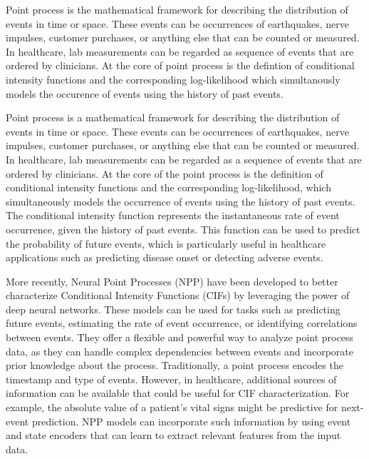 \documentclass[journal,twoside,web]{ieeecolor}
\begin{document}
Point process is the mathematical framework for describing the distribution of events in time or space. These events can be occurrences of earthquakes, nerve impulses, customer purchases, or anything else that can be counted or measured.
In healthcare, lab measurements can be regarded as sequence of events that are ordered by clinicians. At the core of point process is the defintion of conditional intensity functions and the corresponding log-likelihood which simultanously models the occurence of events using the history of past events.

Point process is a mathematical framework for describing the distribution of events in time or space. These events can be occurrences of earthquakes, nerve impulses, customer purchases, or anything else that can be counted or measured. In healthcare, lab measurements can be regarded as a sequence of events that are ordered by clinicians.
At the core of the point process is the definition of conditional intensity functions and the corresponding log-likelihood, which simultaneously models the occurrence of events using the history of past events. The conditional intensity function represents the instantaneous rate of event occurrence, given the history of past events. This function can be used to predict the probability of future events, which is particularly useful in healthcare applications such as predicting disease onset or detecting adverse events.


More recently, Neural Point Processes (NPP) have been developed to better characterize Conditional Intensity Functions (CIFs) by leveraging the power of deep neural networks. These models can be used for tasks such as predicting future events, estimating the rate of event occurrence, or identifying correlations between events. They offer a flexible and powerful way to analyze point process data, as they can handle complex dependencies between events and incorporate prior knowledge about the process.
Traditionally, a point process encodes the timestamp and type of events. However, in healthcare, additional sources of information can be available that could be useful for CIF characterization. For example, the absolute value of a patient's vital signs might be predictive for next-event prediction. NPP models can incorporate such information by using event and state encoders that can learn to extract relevant features from the input data.
\end{document}
